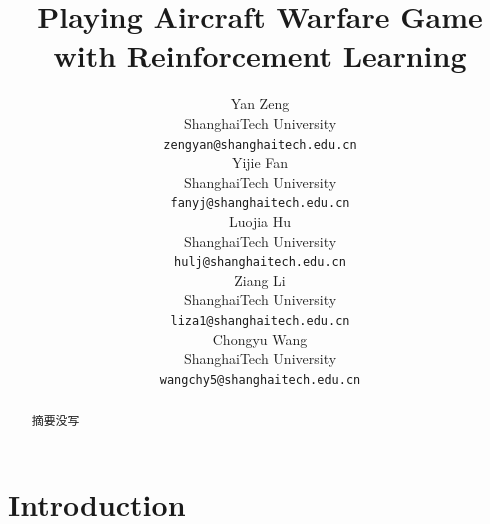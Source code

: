 \documentclass{article}
\title{Playing Aircraft Warfare Game with Reinforcement Learning}
\author{
    Yan Zeng\\
    ShanghaiTech University\\
    \texttt{zengyan@shanghaitech.edu.cn}\\
    \AND
    Yijie Fan\\
    ShanghaiTech University\\
    \texttt{fanyj@shanghaitech.edu.cn}\\
    \AND
    Luojia Hu\\
    ShanghaiTech University\\
    \texttt{hulj@shanghaitech.edu.cn}\\
    \AND
    Ziang Li\\
    ShanghaiTech University\\
    \texttt{liza1@shanghaitech.edu.cn}\\
    \AND
    Chongyu Wang\\
    ShanghaiTech University\\
    \texttt{wangchy5@shanghaitech.edu.cn}\\    
}
\begin{document}
\maketitle

\begin{abstract}
    摘要没写
\end{abstract}


\section{Introduction}







\end{document}
